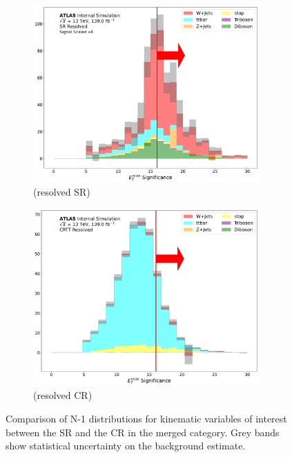 \begin{figure}[htbp]
  \begin{subfigure}{0.45\textwidth}
     \includegraphics[width = 0.95\textwidth]{Figures/App_SR_CR_distributions/SR1L_Resolved/MetTST_Significance_N_1.pdf}
    \caption{\metsig (resolved SR)}
     \end{subfigure}
    \begin{subfigure}{0.45\textwidth}
     \includegraphics[width = 0.95\textwidth]{Figures/App_SR_CR_distributions/CRTT_Resolved/MetTST_Significance_N_1.pdf}
     \caption{\metsig (resolved \ttbar CR)}
     \end{subfigure}
     \caption{Comparison of N-1 distributions for kinematic variables of interest between the SR and the \ttbar CR in the merged category. Grey bands show statistical uncertainty on the background estimate.}
     \end{figure}

